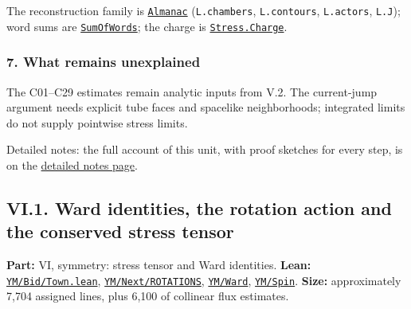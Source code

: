 \documentclass[
  letterpaper,
  11pt]{article}
\begin{document}
The reconstruction family is
\href{https://github.com/yang-mills-group/OpenAI-YM-20261028/blob/3456e5e75cf8d4cd558955a5c7638fba2d68f464/YM/EveryPhase/Pack.lean\#L117-L132}{\texttt{Almanac}}
(\texttt{L.chambers}, \texttt{L.contours}, \texttt{L.actors},
\texttt{L.J}); word sums are
\href{https://github.com/yang-mills-group/OpenAI-YM-20261028/blob/3456e5e75cf8d4cd558955a5c7638fba2d68f464/YM/EveryPhase/Polynomials.lean\#L14}{\texttt{SumOfWords}};
the charge is
\href{https://github.com/yang-mills-group/OpenAI-YM-20261028/blob/3456e5e75cf8d4cd558955a5c7638fba2d68f464/YM/EveryPhase/Charge.lean\#L80-L81}{\texttt{Stress.Charge}}.

\subsubsection{7. What remains
unexplained}\label{what-remains-unexplained-22}

The C01--C29 estimates remain analytic inputs from V.2. The current-jump
argument needs explicit tube faces and spacelike neighborhoods;
integrated limits do not supply pointwise stress limits.

Detailed notes: the full account of this unit, with proof sketches for
every step, is on the
\href{https://github.com/scottnarmstrong/yang-mills-informalization/blob/main/outline/notes/V-3.md}{detailed
notes page}.

\subsection{VI.1. Ward identities, the rotation action and the conserved
stress
tensor}\label{vi.1.-ward-identities-the-rotation-action-and-the-conserved-stress-tensor}

\textbf{Part:} VI, symmetry: stress tensor and Ward identities.
\textbf{Lean:}
\href{https://github.com/yang-mills-group/OpenAI-YM-20261028/blob/3456e5e75cf8d4cd558955a5c7638fba2d68f464/YM/Bid/Town.lean}{\texttt{YM/Bid/Town.lean}},
\href{https://github.com/yang-mills-group/OpenAI-YM-20261028/tree/3456e5e75cf8d4cd558955a5c7638fba2d68f464/YM/Next/ROTATIONS}{\texttt{YM/Next/ROTATIONS}},
\href{https://github.com/yang-mills-group/OpenAI-YM-20261028/tree/3456e5e75cf8d4cd558955a5c7638fba2d68f464/YM/Ward}{\texttt{YM/Ward}},
\href{https://github.com/yang-mills-group/OpenAI-YM-20261028/tree/3456e5e75cf8d4cd558955a5c7638fba2d68f464/YM/Spin}{\texttt{YM/Spin}}.
\textbf{Size:} approximately 7,704 assigned lines, plus 6,100 of
collinear flux estimates.
\end{document}
